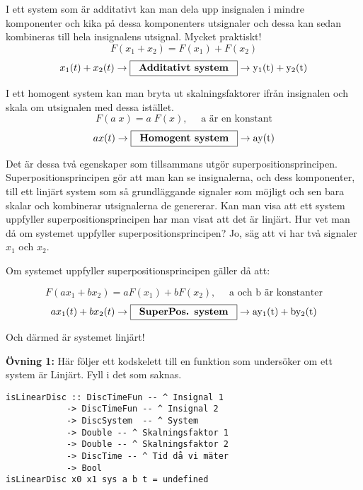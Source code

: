 \documentclass{article}
\begin{document}
I ett system som är additativt kan man dela upp insignalen i mindre
komponenter och kika på dessa komponenters utsignaler och dessa kan sedan
kombineras till hela insignalens utsignal. Mycket praktiskt!
$$F(x_{1}+x_{2}) = F(x_{1}) + F(x_{2})$$
$$x_{1}(t) + x_{2}(t) \rightarrow \framebox[1.2\width]{\textbf{Additativt system}} \rightarrow \mathrm{y_{1}(t) + y_{2}(t)}$$

I ett homogent system kan man bryta ut skalningsfaktorer ifrån insignalen och skala om utsignalen med dessa istället.
$$F(a \; x) = a\;F(x), \quad \mbox{ a är en konstant} $$
$$a x(t) \rightarrow \framebox[1.2\width]{\textbf{Homogent system}} \rightarrow \mathrm{a y(t)}$$

Det är dessa två egenskaper som tillsammans utgör superpositionsprincipen.
Superpositionsprincipen gör att man kan se insignalerna, och dess
komponenter, till ett linjärt system som så grundläggande signaler som
möjligt och sen bara skalar och kombinerar utsignalerna de genererar.
Kan man visa att
ett system uppfyller superpositionsprincipen har man visat att det är
linjärt.
Hur vet man då om systemet uppfyller superpositionsprincipen? Jo, säg att vi har två signaler $x_1$ och $x_2$.

Om systemet uppfyller superpositionsprincipen gäller då att:

$$F(a x_{1}+b x_{2}) = a F(x_{1}) + b F(x_{2}), \quad
\mbox{ a och b är konstanter}
$$
$$a x_{1}(t)+b x_{2}(t) \rightarrow \framebox[1.2\width]{\textbf{SuperPos. system}} \rightarrow \mathrm{a y_{1}(t)+b y_{2}(t)}
$$

Och därmed är systemet linjärt!

\textbf{Övning 1:} Här följer ett kodskelett till en funktion som undersöker om ett
system är Linjärt. Fyll i det som saknas.

\begin{verbatim}
isLinearDisc :: DiscTimeFun -- ^ Insignal 1
            -> DiscTimeFun -- ^ Insignal 2
            -> DiscSystem  -- ^ System
            -> Double -- ^ Skalningsfaktor 1
            -> Double -- ^ Skalningsfaktor 2
            -> DiscTime -- ^ Tid då vi mäter
            -> Bool
isLinearDisc x0 x1 sys a b t = undefined
\end{verbatim}
\end{document}

